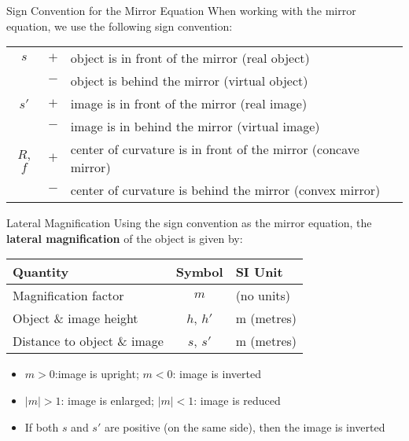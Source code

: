 \documentclass[12pt,compress,aspectratio=169]{beamer}
\begin{document}
\begin{frame}{Sign Convention for the Mirror Equation}
  When working with the mirror equation, we use the following sign convention:
  
  \begin{center}
    \begin{tabular}{ccl}
      \hline
      $s$ & $+$ & object is in front of the mirror (real object) \\
      & $-$ & object is behind the mirror (virtual object)\\\hline
      $s'$ & $+$ & image is in front of the mirror (real image)\\
      & $-$ & image is in behind the mirror (virtual image)\\\hline
      $R$, $f$ & $+$ & center of curvature is in front of the mirror
      (concave mirror)\\
      & $-$ & center of curvature is behind the mirror (convex mirror)\\
      \hline
    \end{tabular}
  \end{center}
\end{frame}



\begin{frame}{Lateral Magnification}
  Using the sign convention as the mirror equation, the
  \textbf{lateral magnification} of the object is given by:

  \begin{center}
    \begin{tabular}{l|c|l}
      \rowcolor{pink}
      \textbf{Quantity} & \textbf{Symbol} & \textbf{SI Unit} \\ \hline
      Magnification factor & $m$ & (no units)\\
      Object \& image height & $h$, $h'$  & \si{\metre} (metres)\\
      Distance to object \& image & $s$, $s'$  & \si{\metre} (metres)
    \end{tabular}
  \end{center}
  \begin{itemize}
  \item $m>0$:image is upright; $m<0$: image is inverted
  \item $|m|>1$: image is enlarged; $|m|<1$: image is reduced
  \item If both $s$ and $s'$ are positive (on the same side), then the image
    is inverted
  \end{itemize}
\end{frame}
\end{document}
